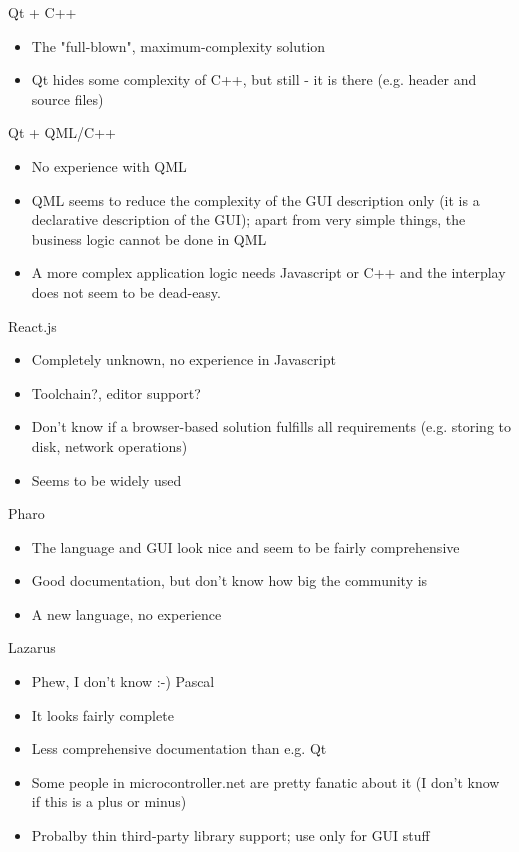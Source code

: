 Qt + C++
\begin{itemize}
	\item The "full-blown", maximum-complexity solution
	\item Qt hides some complexity of C++, but still - it is there (e.g. header and source files)
\end{itemize}


Qt + QML/C++
\begin{itemize}
	\item No experience with QML
	\item QML seems to reduce the complexity of the GUI description only (it is a declarative description of the GUI); apart from very simple things, the business logic cannot be done in QML
	\item A more complex application logic needs Javascript or C++ and the interplay does not seem to be dead-easy.
\end{itemize}


React.js
\begin{itemize}
	\item Completely unknown, no experience in Javascript
	\item Toolchain?, editor support?
	\item Don't know if a browser-based solution fulfills all requirements (e.g. storing to disk, network operations)
	\item Seems to be widely used
\end{itemize}

Pharo
\begin{itemize}
	\item The language and GUI look nice and seem to be fairly comprehensive
	\item Good documentation, but don't know how big the community is
	\item A new language, no experience
\end{itemize}


Lazarus
\begin{itemize}
	\item Phew, I don't know :-) Pascal
    \item It looks fairly complete
    \item Less comprehensive documentation than e.g. Qt
    \item Some people in microcontroller.net are pretty fanatic about it (I don't know if this is a plus or minus)
    \item Probalby thin third-party library support; use only for GUI stuff
\end{itemize}

